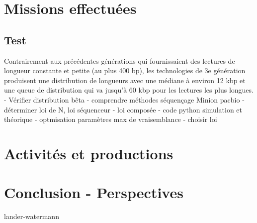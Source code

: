 \documentclass[12pt,a4paper]{article} %
\begin{document}
\section{Missions effectuées} \subsection{Test}
Contrairement aux précédentes générations qui fournissaient des lectures
de longueur constante et petite (au plus 400 bp), les technologies de 3e
génération produisent une distribution de longueurs avec une médiane à
environ 12 kbp et une queue de distribution qui va jusqu'à 60 kbp pour les
lectures les plus longues.
- Vérifier distribution bêta
- comprendre méthodes séquençage Minion pacbio
- déterminer loi de N, loi séquenceur
- loi composée
- code python simulation et théorique
- optmisation paramètres max de vraisemblance
- choisir loi

\section{Activités et productions} 

\section{Conclusion - Perspectives} 
lander-watermann
\newpage
\listoffigures
\newpage
\newpage

\nocite{*}

\end{document}
